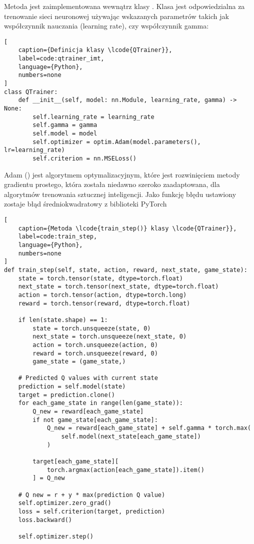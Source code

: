 Metoda  jest zaimplementowana wewnątrz klasy . Klasa  jest odpowiedzialna za trenowanie sieci neuronowej używając wskazanych parametrów takich jak współczynnik nauczania (learning rate), czy współczynnik gamma:

\begin{onepage}
    \begin{lstlisting}[
    caption={Definicja klasy \lcode{QTrainer}},
    label=code:qtrainer_imt,
    language={Python},
    numbers=none
]
class QTrainer:
    def __init__(self, model: nn.Module, learning_rate, gamma) -> None:
        self.learning_rate = learning_rate
        self.gamma = gamma
        self.model = model
        self.optimizer = optim.Adam(model.parameters(), lr=learning_rate)
        self.criterion = nn.MSELoss()
    \end{lstlisting}
\end{onepage}


Adam () \cite{AdamOpt1} \cite{AdamOpt2} jest algorytmem optymalizacyjnym, które jest rozwinięciem metody gradientu prostego, która została niedawno szeroko zaadaptowana, dla algorytmów trenowania sztucznej inteligencji. Jako funkcję błędu ustawiony zostaje błąd średniokwadratowy z biblioteki PyTorch 

\clearpage



\begin{onepage}
    \begin{lstlisting}[
    caption={Metoda \lcode{train_step()} klasy \lcode{QTrainer}},
    label=code:train_step,
    language={Python},
    numbers=none
]
def train_step(self, state, action, reward, next_state, game_state):
    state = torch.tensor(state, dtype=torch.float)
    next_state = torch.tensor(next_state, dtype=torch.float)
    action = torch.tensor(action, dtype=torch.long)
    reward = torch.tensor(reward, dtype=torch.float)

    if len(state.shape) == 1:
        state = torch.unsqueeze(state, 0)
        next_state = torch.unsqueeze(next_state, 0)
        action = torch.unsqueeze(action, 0)
        reward = torch.unsqueeze(reward, 0)
        game_state = (game_state,)

    # Predicted Q values with current state
    prediction = self.model(state)
    target = prediction.clone()
    for each_game_state in range(len(game_state)):
        Q_new = reward[each_game_state]
        if not game_state[each_game_state]:
            Q_new = reward[each_game_state] + self.gamma * torch.max(
                self.model(next_state[each_game_state])
            )

        target[each_game_state][
            torch.argmax(action[each_game_state]).item()
        ] = Q_new

    # Q new = r + y * max(prediction Q value)
    self.optimizer.zero_grad()
    loss = self.criterion(target, prediction)
    loss.backward()

    self.optimizer.step()

\end{lstlisting}
\end{onepage}

